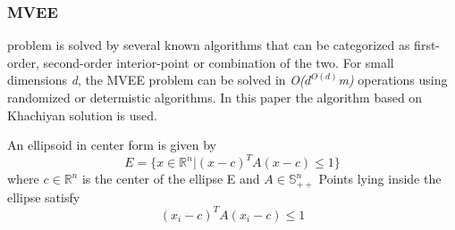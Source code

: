 \documentclass{llncs}
\begin{document}

\subsubsection{MVEE}

problem is solved by several known algorithms that can be categorized as first-order, second-order interior-point or combination of the two. For small dimensions \textit{d}, the MVEE problem can be solved in \textit{O($d^{O(d)}$m)} operations using randomized or determistic algorithms\cite{MVEEMichaelTodd2005}. In this paper the algorithm based on Khachiyan solution is used.

\noindent An ellipsoid in center form is given by \[ E = \{x \in \mathbb{R}^{n} | (x - c)^{T}A(x-c) \le 1\} \] where $c \in \mathbb{R}^{n}$ is the center of the ellipse E and $ A \in \mathbb{S}^{n}_{++}$ Points lying inside the ellipse satisfy \[ (x_{i} - c)^{T}A(x_{i} - c) \le 1 \]
\end{document}
